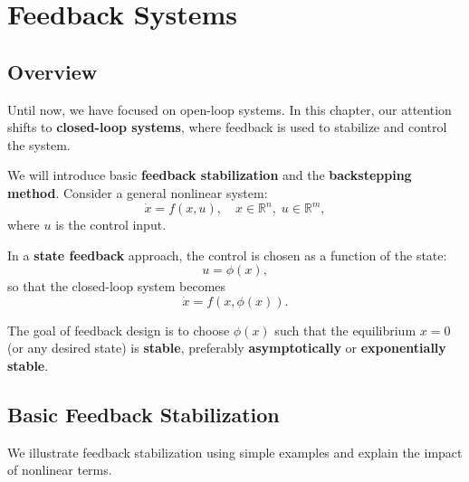 \chapterspaceabove{6.75cm} %
\chapterspacebelow{7.25cm} %

\chapter{Feedback Systems}

\section{Overview}

Until now, we have focused on open-loop systems. In this chapter, our attention shifts to \textbf{closed-loop systems}, where feedback is used to stabilize and control the system.  

We will introduce basic \textbf{feedback stabilization} and the \textbf{backstepping method}. Consider a general nonlinear system:
\[
\dot{x} = f(x,u), \quad x \in \mathbb{R}^n, \; u \in \mathbb{R}^m,
\]
where \(u\) is the control input.  

In a \textbf{state feedback} approach, the control is chosen as a function of the state:
\[
u = \phi(x),
\]
so that the closed-loop system becomes
\[
\dot{x} = f(x, \phi(x)).
\]

The goal of feedback design is to choose \(\phi(x)\) such that the equilibrium \(x=0\) (or any desired state) is \textbf{stable}, preferably \textbf{asymptotically} or \textbf{exponentially stable}.

\section{Basic Feedback Stabilization}

We illustrate feedback stabilization using simple examples and explain the impact of nonlinear terms.  

